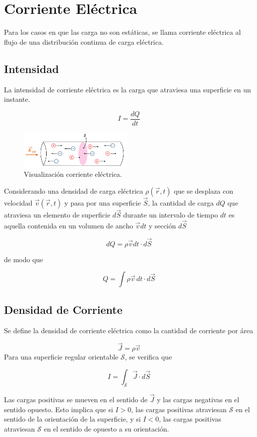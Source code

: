 \section{Corriente Eléctrica}

Para los casos en que las carga no son estáticas, se llama corriente eléctrica al flujo de una distribución continua de carga eléctrica.

\subsection{Intensidad}

La intensidad de corriente eléctrica es la carga que atraviesa una superficie en un instante.

\[I = \frac{dQ}{dt}\]

\begin{figure}[H]
    \centering
    \includegraphics[width=0.49\textwidth]{Corriente/corriente.png}
    \caption{Visualización corriente eléctrica.}
\end{figure}

Considerando una densidad de carga eléctrica $\rho(\Vec{r},t)$ que se desplaza con velocidad $\Vec{v}(\Vec{r},t)$ y pasa por una superficie $\Vec{S}$, la cantidad de carga $dQ$ que atraviesa un elemento de superficie $d\Vec{S}$ durante un intervalo de tiempo $dt$ es aquella contenida en un volumen de ancho $\Vec{v}dt$ y sección $d\Vec{S}$

\[dQ = \rho\Vec{v}dt\cdot d\Vec{S}\]
\bigbreak

de modo que

\[Q = \int\rho\Vec{v}\,dt\cdot d\Vec{S}\]

\subsection{Densidad de Corriente}

Se define la densidad de corriente eléctrica como la cantidad de corriente por área

\[\Vec{J}=\rho\Vec{v}\]
\bigbreak
Para una superficie regular orientable $\mathcal{S}$, se verifica que

\[I = \int_\mathcal{S} \Vec{J}\cdot d\Vec{S}\]
\bigbreak

Las cargas positivas se mueven en el sentido de $\Vec{J}$ y las cargas negativas en el sentido opuesto. Esto implica que si $I > 0$, las cargas positivas atraviesan $\mathcal{S}$ en el sentido de la orientación de la superficie, y si $I < 0$, las cargas positivas atraviesan $\mathcal{S}$ en el sentido de opuesto a su orientación.

